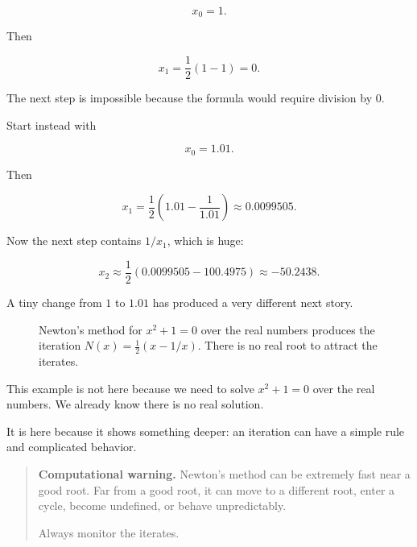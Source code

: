 \[
x_0=1.
\]

Then

\[
x_1=\frac12(1-1)=0.
\]

The next step is impossible because the formula would require division by \(0\).

Start instead with

\[
x_0=1.01.
\]

Then

\[
x_1
=
\frac12\left(1.01-\frac1{1.01}\right)
\approx 0.0099505.
\]

Now the next step contains \(1/x_1\), which is huge:

\[
x_2
\approx
\frac12(0.0099505-100.4975)
\approx -50.2438.
\]

A tiny change from \(1\) to \(1.01\) has produced a very different next story.

\begin{figure}[h]
\centering
{}
\caption{Newton's method for \(x^2+1=0\) over the real numbers produces the iteration \(N(x)=\frac12(x-1/x)\).  There is no real root to attract the iterates.}
\label{fig:newton-map-x2-plus-1}
\end{figure}

This example is not here because we need to solve \(x^2+1=0\) over the real numbers.
We already know there is no real solution.

It is here because it shows something deeper: an iteration can have a simple rule and
complicated behavior.

\begin{quote}
\textbf{Computational warning.}
Newton's method can be extremely fast near a good root.  Far from a good root, it can
move to a different root, enter a cycle, become undefined, or behave unpredictably.

Always monitor the iterates.
\end{quote}

